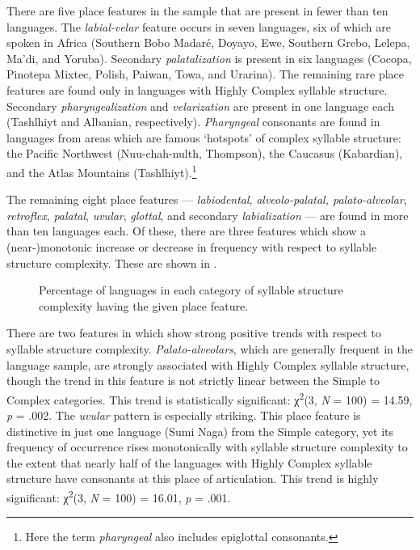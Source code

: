   There are five place features in the sample that are present in fewer than ten languages. The \textit{labial-velar} feature occurs in seven languages, six of which are spoken in Africa (Southern Bobo Madaré, Doyayo, Ewe, Southern Grebo, Lelepa, Ma’di, and Yoruba). Secondary \textit{palatalization} is present in six languages (Cocopa, Pinotepa Mixtec, Polish, Paiwan, Towa, and Urarina). The remaining rare place features are found only in languages with Highly Complex syllable structure. Secondary \textit{pharyngealization} and \textit{velarization} are present in one language each (Tashlhiyt and Albanian, respectively). \textit{Pharyngeal} consonants are found in languages from areas which are famous ‘hotspots’ of complex syllable structure: the Pacific Northwest (Nuu-chah-nulth, Thompson), the Caucasus (Kabardian), and the Atlas Mountains (Tashlhiyt).\footnote{{Here the term} \textrm{\textit{pharyngeal} }\textrm{also includes epiglottal consonants.}}

  The remaining eight place features — \textit{labiodental}, \textit{alveolo-palatal, palato-alveolar}, \textit{retroflex}, \textit{palatal}, \textit{uvular}, \textit{glottal}, and secondary \textit{labialization} — are found in more than ten languages each. Of these, there are three features which show a (near-)monotonic increase or decrease in frequency with respect to syllable structure complexity. These are shown in .

\begin{figure}
\caption{\label{fig:4.8} Percentage of languages in each category of syllable structure complexity having the given place feature.}
\end{figure}

  There are two features in  which show strong positive trends with respect to syllable structure complexity. \textit{Palato-alveolars}, which are generally frequent in the language sample, are strongly associated with Highly Complex syllable structure, though the trend in this feature is not strictly linear between the Simple to Complex categories. This trend is statistically significant: χ\textsuperscript{2}(3, \textit{N} = 100) = 14.59, \textit{p} = .002. The \textit{uvular} pattern is especially striking. This place feature is distinctive in just one language (Sumi Naga) from the Simple category, yet its frequency of occurrence rises monotonically with syllable structure complexity to the extent that nearly half of the languages with Highly Complex syllable structure have consonants at this place of articulation. This trend is highly significant: χ\textsuperscript{2}(3, \textit{N} = 100) = 16.01, \textit{p} = .001. 

